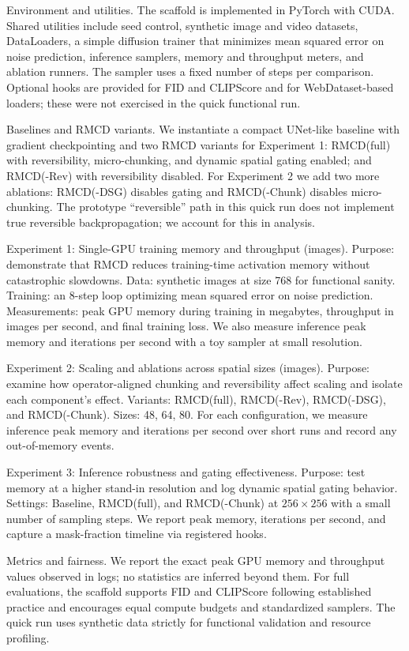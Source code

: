 \documentclass{article}
\begin{document}
Environment and utilities. The scaffold is implemented in PyTorch with CUDA. Shared utilities include seed control, synthetic image and video datasets, DataLoaders, a simple diffusion trainer that minimizes mean squared error on noise prediction, inference samplers, memory and throughput meters, and ablation runners. The sampler uses a fixed number of steps per comparison. Optional hooks are provided for FID and CLIPScore and for WebDataset-based loaders; these were not exercised in the quick functional run.

Baselines and RMCD variants. We instantiate a compact UNet-like baseline with gradient checkpointing and two RMCD variants for Experiment 1: RMCD(full) with reversibility, micro-chunking, and dynamic spatial gating enabled; and RMCD(-Rev) with reversibility disabled. For Experiment 2 we add two more ablations: RMCD(-DSG) disables gating and RMCD(-Chunk) disables micro-chunking. The prototype ``reversible'' path in this quick run does not implement true reversible backpropagation; we account for this in analysis.

Experiment 1: Single-GPU training memory and throughput (images). Purpose: demonstrate that RMCD reduces training-time activation memory without catastrophic slowdowns. Data: synthetic images at size 768 for functional sanity. Training: an 8-step loop optimizing mean squared error on noise prediction. Measurements: peak GPU memory during training in megabytes, throughput in images per second, and final training loss. We also measure inference peak memory and iterations per second with a toy sampler at small resolution.

Experiment 2: Scaling and ablations across spatial sizes (images). Purpose: examine how operator-aligned chunking and reversibility affect scaling and isolate each component’s effect. Variants: RMCD(full), RMCD(-Rev), RMCD(-DSG), and RMCD(-Chunk). Sizes: 48, 64, 80. For each configuration, we measure inference peak memory and iterations per second over short runs and record any out-of-memory events.

Experiment 3: Inference robustness and gating effectiveness. Purpose: test memory at a higher stand-in resolution and log dynamic spatial gating behavior. Settings: Baseline, RMCD(full), and RMCD(-Chunk) at \(256\times256\) with a small number of sampling steps. We report peak memory, iterations per second, and capture a mask-fraction timeline via registered hooks.

Metrics and fairness. We report the exact peak GPU memory and throughput values observed in logs; no statistics are inferred beyond them. For full evaluations, the scaffold supports FID and CLIPScore following established practice \cite{dhariwal-2021-diffusion,hessel-2021-clipscore} and encourages equal compute budgets and standardized samplers. The quick run uses synthetic data strictly for functional validation and resource profiling.
\end{document}
